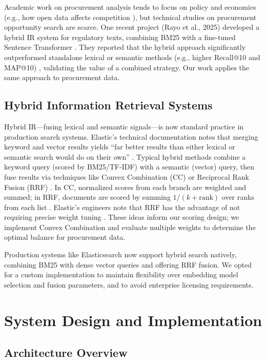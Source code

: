 \documentclass[10pt,twocolumn]{article}
\begin{document}
Academic work on procurement analysis tends to focus on policy and economics (e.g., how open data affects competition \cite{Rauter2020,Omari2025}), but technical studies on procurement opportunity search are scarce. One recent project (Rayo et al., 2025) developed a hybrid IR system for regulatory texts, combining BM25 with a fine-tuned Sentence Transformer \cite{Rayo2025}. They reported that the hybrid approach significantly outperformed standalone lexical or semantic methods (e.g., higher Recall@10 and MAP@10) \cite{Rayo2025}, validating the value of a combined strategy. Our work applies the same approach to procurement data.

\subsection{Hybrid Information Retrieval Systems}

Hybrid IR---fusing lexical and semantic signals---is now standard practice in production search systems. Elastic's technical documentation notes that merging keyword and vector results yields ``far better results than either lexical or semantic search would do on their own'' \cite{ElasticHybrid}. Typical hybrid methods combine a keyword query (scored by BM25/TF-IDF) with a semantic (vector) query, then fuse results via techniques like Convex Combination (CC) or Reciprocal Rank Fusion (RRF) \cite{ElasticHybrid}. In CC, normalized scores from each branch are weighted and summed; in RRF, documents are scored by summing $1/(k + \text{rank})$ over ranks from each list \cite{ElasticHybrid}. Elastic's engineers note that RRF has the advantage of not requiring precise weight tuning \cite{ElasticHybrid}. These ideas inform our scoring design; we implement Convex Combination and evaluate multiple weights to determine the optimal balance for procurement data.

Production systems like Elasticsearch now support hybrid search natively, combining BM25 with dense vector queries and offering RRF fusion. We opted for a custom implementation to maintain flexibility over embedding model selection and fusion parameters, and to avoid enterprise licensing requirements.

\section{System Design and Implementation}

\subsection{Architecture Overview}
\end{document}
